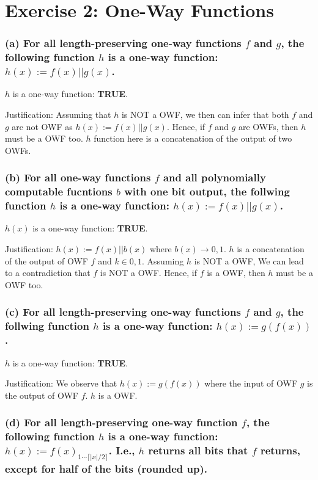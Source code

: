 \section{Exercise 2: One-Way Functions}
\subsubsection{(a) For all length-preserving one-way functions \(f\) and \(g\), the
following function \(h\) is a one-way function: \(h(x):=f(x)||g(x)\).}

\(h\) is a one-way function: \textbf{TRUE}.

Justification: Assuming that \(h\) is NOT a OWF, we then can infer that both
\(f\) and \(g\) are not OWF as \(h(x):= f(x)||g(x)\). Hence, if \(f\) and \(g\)
are OWFs, then \(h\) must be a OWF too. \(h\) function here is a concatenation of
the output of two OWFs.

\subsubsection{(b) For all one-way functions \(f\) and all polynomially computable fucntions
\(b\) with one bit output, the follwing function \(h\) is a one-way function:
\(h(x):=f(x)||g(x)\).}

\(h(x)\) is a one-way function: \textbf{TRUE}.

Justification: \(h(x):=f(x)||b(x)\) where \(b(x) \rightarrow {0,1}\). \(h\) is a concatenation of
the output of OWF \(f\) and \(k \in {0,1}\). Assuming \(h\) is NOT a OWF, We can lead to a
contradiction that \(f\) is NOT a OWF. Hence, if \(f\) is a OWF, then \(h\) must be a OWF too.

\subsubsection{(c) For all length-preserving one-way functions \(f\) and \(g\), the follwing function
\(h\) is a one-way function: \(h(x):=g(f(x))\).}

\(h\) is a one-way function: \textbf{TRUE}.

Justification: We observe that \(h(x):=g(f(x))\) where the input of OWF \(g\) is the output
of OWF \(f\). \(h\) is a OWF.

\subsubsection{(d) For all length-preserving one-way function \(f\), the following function \(h\)
is a one-way function: \(h(x):=f(x)_{1\cdots \lceil |x|/2 \rceil}\). I.e., \(h\) returns all bits
that \(f\) returns, except for half of the bits (rounded up).}

